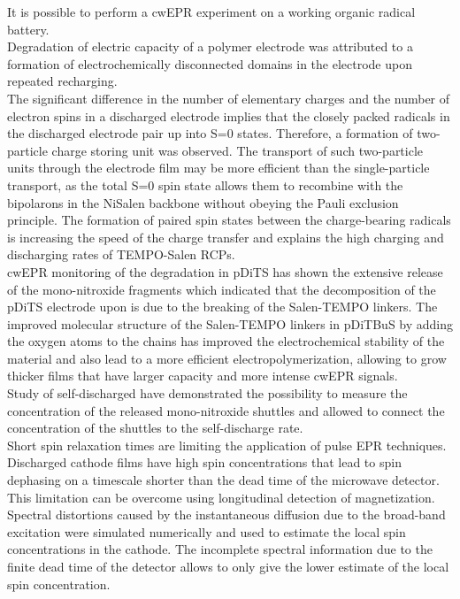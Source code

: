 It is possible to perform a cwEPR experiment on a working organic radical battery.\\
Degradation of electric capacity of a polymer electrode was attributed to a formation of electrochemically disconnected domains in the electrode upon repeated recharging.\\

The significant difference in the number of elementary charges and the number of electron spins in a discharged electrode implies that the closely packed radicals in the discharged electrode pair up into S=0 states. Therefore, a formation of two-particle charge storing unit was observed. The transport of such two-particle units through the electrode film may be more efficient than the single-particle transport, as the total S=0 spin state allows them to recombine with the bipolarons in the NiSalen backbone without obeying the Pauli exclusion principle. The formation of paired spin states between the charge-bearing radicals is increasing the speed of the charge transfer and explains the high charging and discharging rates of TEMPO-Salen RCPs.\\

cwEPR monitoring of the degradation in pDiTS has shown the extensive release of the mono-nitroxide fragments which indicated that the decomposition of the pDiTS electrode upon is due to the breaking of the Salen-TEMPO linkers. The improved molecular structure of the Salen-TEMPO linkers in pDiTBuS by adding the oxygen atoms to the chains has improved the electrochemical stability of the material and also lead to a more efficient electropolymerization, allowing to grow thicker films that have larger capacity and more intense cwEPR signals.\\

Study of self-discharged have demonstrated the possibility to measure the concentration of the released mono-nitroxide shuttles and allowed to connect the concentration of the shuttles to the self-discharge rate.\\

Short spin relaxation times are limiting the application of pulse EPR techniques. Discharged cathode films have high spin concentrations that lead to spin dephasing on a timescale shorter than the dead time of the microwave detector. This limitation can be overcome using longitudinal detection of magnetization.\\

Spectral distortions caused by the instantaneous diffusion due to the broad-band excitation were simulated numerically and used to estimate the local spin concentrations in the cathode. The incomplete spectral information due to the finite dead time of the detector allows to only give the 
lower estimate of the local spin concentration.\\

